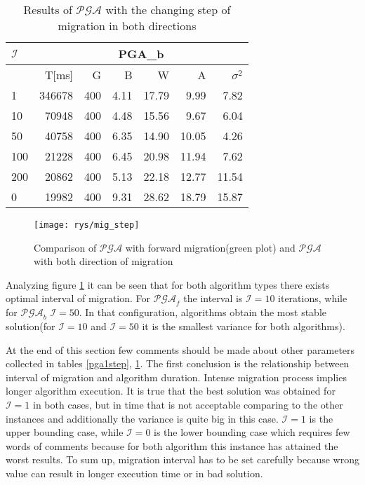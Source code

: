\begin{table}[!htpb]
	\label{pga2step}
	\caption{Results of $\mathcal{PGA}$ with the changing
	step of migration in both directions}
	\centering
	\begin{tabular}{l||r|r|r|r|r|r|}
        $\mathcal{I}$ & \multicolumn{6}{c|}{PGA\_b} \\ \hline
		          &T[ms]&G& B&W&A&$\sigma^2$ \\ \hline
	1&346678&400&4.11&17.79&9.99&7.82\\ \hline
	10&70948&400&4.48&15.56&9.67&6.04\\ \hline
	50&40758&400&6.35&14.90&10.05&4.26\\ \hline
	100&21228&400&6.45&20.98&11.94&7.62\\ \hline
	200&20862&400&5.13&22.18&12.77&11.54\\ \hline
	0&19982&400&9.31&28.62&18.79&15.87\\ \hline
	\end{tabular}
\end{table}

\begin{figure}[!htpb]
	\begin{center}
		\texttt{[image: rys/mig\_step]}
	\end{center}
	\caption{Comparison of $\mathcal{PGA}$ with forward migration(green plot)
	and $\mathcal{PGA}$ with both direction of migration}
	\label{fig:step1}
\end{figure}
Analyzing figure \ref{fig:step1} it can be seen that for both algorithm types
there exists optimal interval of migration. For $\mathcal{PGA}_f$ the interval
is $\mathcal{I}=10$ iterations, while for $\mathcal{PGA}_b$ $\mathcal{I}=50$.
In that configuration, algorithms obtain the most stable solution(for
$\mathcal{I}=10$ and $\mathcal{I}=50$ it is the smallest variance for both
algorithms).

At the end of this section few comments should be made about other parameters
collected in tables \ref{pga1step}, \ref{pga2step}. The first conclusion is
the relationship between interval of migration and algorithm duration.
Intense migration process implies longer algorithm execution. It is true that the
best solution was obtained for $\mathcal{I}=1$ in both cases, but in time that
is not acceptable comparing to the other instances and additionally the variance is
quite big in this case. $\mathcal{I}=1$ is the upper bounding case, while $\mathcal{I}=0$ is
the lower bounding case which requires few words of comments because for both algorithm
this instance has attained the worst results. To sum up, migration
interval has to be set carefully because wrong value can result in longer
execution time or in bad solution.


